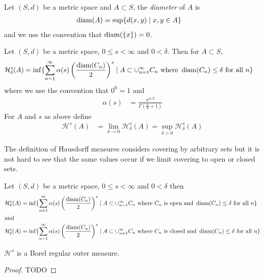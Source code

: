 \begin{defn}Let $(S,d)$ be a metric space and $A \subset S$, the
  \emph{diameter} of $A$ is 
\begin{align*}
\operatorname*{diam}(A) &= \sup \lbrace d(x,y) \mid x,y \in A \rbrace
\end{align*}
and we use the convention that $\operatorname*{diam}(\lbrace x \rbrace) = 0$.
\end{defn}

\begin{defn}Let $(S,d)$ be a metric space, $0 \leq s < \infty$ and $0
  < \delta$.  Then for $A \subset S$, 
\begin{align*}
\mathcal{H}^s_\delta(A) &= \inf \lbrace \sum_{n=1}^\infty \alpha(s)
\left ( \frac{\operatorname*{diam}(C_n)}{2}\right )^s \mid A \subset
\cup_{n=1}^\infty C_n \text{ where } \operatorname*{diam}(C_n) \leq \delta \text{ for
  all } n\rbrace
\end{align*}
where we use the convention that $0^0=1$ and
\begin{align*}
\alpha(s) &= \frac{\pi^{n/2}}{\Gamma(\frac{n}{2} + 1)}
\end{align*}
For $A$ and $s$ as above define
\begin{align*}
\mathcal{H}^s(A) &= \lim_{\delta \to 0} \mathcal{H}_\delta^s(A) = \sup_{\delta>0} \mathcal{H}_\delta^s(A)
\end{align*}
\end{defn}

The definition of Hausdorff measures considers covering by arbitrary sets but it is not hard to see that 
the same values occur if we limit covering to open or closed sets.
\begin{prop}\label{HausdorffMeasureByOpenClosedCoverings}Let $(S,d)$ be a metric space, $0 \leq s < \infty$ and $0
  < \delta$ then 
\begin{align*}
\mathcal{H}^s_\delta(A) &= \inf \lbrace \sum_{n=1}^\infty \alpha(s)
\left ( \frac{\operatorname*{diam}(C_n)}{2}\right )^s \mid A \subset
\cup_{n=1}^\infty C_n \text{ where $C_n$ is open and } \operatorname*{diam}(C_n) \leq \delta \text{ for
  all } n\rbrace \\
\intertext{and}
\mathcal{H}^s_\delta(A) &= \inf \lbrace \sum_{n=1}^\infty \alpha(s)
\left ( \frac{\operatorname*{diam}(C_n)}{2}\right )^s \mid A \subset
\cup_{n=1}^\infty C_n \text{ where $C_n$ is closed and } \operatorname*{diam}(C_n) \leq \delta \text{ for
  all } n\rbrace
\end{align*}
\end{prop}

\begin{thm}\label{BorelRegularityOfHausdorffMeasure}$\mathcal{H}^s$ is a Borel regular outer measure.
\end{thm}
\begin{proof}
TODO
\end{proof}

